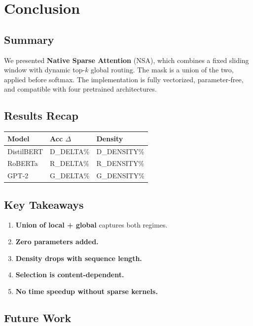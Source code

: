 
\section{Conclusion}

\subsection{Summary}

We presented \textbf{Native Sparse Attention} (NSA), which combines a fixed 
sliding window with dynamic top-$k$ global routing. The mask is a union of 
the two, applied before softmax. The implementation is fully vectorized, 
parameter-free, and compatible with four pretrained architectures.

\subsection{Results Recap}

\begin{table}[H]
\centering
\small
\begin{tabular}{lll}
\toprule
\textbf{Model} & \textbf{Acc $\Delta$} & \textbf{Density} \\
\midrule
DistilBERT & {{D\_DELTA}}\% & {{D\_DENSITY}}\% \\
RoBERTa & {{R\_DELTA}}\% & {{R\_DENSITY}}\% \\
GPT-2 & {{G\_DELTA}}\% & {{G\_DENSITY}}\% \\
\bottomrule
\end{tabular}
\end{table}

\subsection{Key Takeaways}

\begin{enumerate}
\item \textbf{Union of local + global} captures both regimes.
\item \textbf{Zero parameters added.}
\item \textbf{Density drops with sequence length.}
\item \textbf{Selection is content-dependent.}
\item \textbf{No time speedup without sparse kernels.}

\end{enumerate}
\subsection{Future Work}

